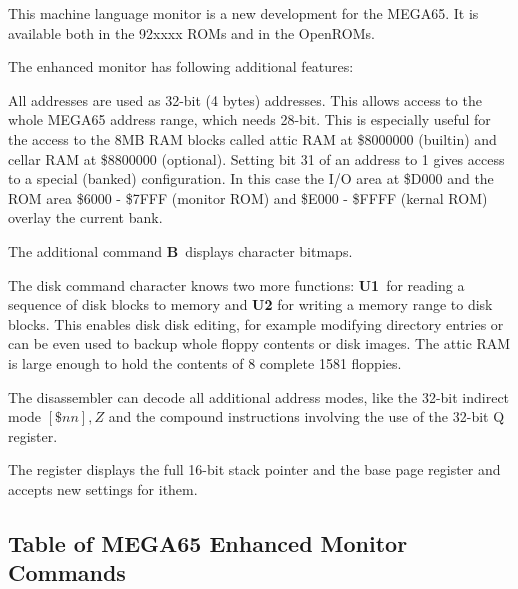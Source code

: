 This machine language monitor is a new development for the MEGA65.
It is available both in the 92xxxx ROMs and in the OpenROMs.

The enhanced monitor has following additional features:
\begin{description}[leftmargin=1cm,style=nextline]
\item[Adddresses:] All addresses are used as 32-bit (4 bytes) addresses.
   This allows access to the whole MEGA65 address range, which needs
   28-bit. This is especially useful for the access to the 8MB RAM blocks
   called attic RAM at \$8000000 (builtin) and cellar RAM at
   \$8800000 (optional). Setting bit 31 of an address to 1 gives access
   to a special (banked) configuration. In this case the I/O area at \$D000
   and the ROM area \$6000 - \$7FFF (monitor ROM) and \$E000 - \$FFFF
   (kernal ROM) overlay the current bank.

\item[Commands:] The additional command {\bf B} displays character bitmaps.

\item[Disk access:] The disk command character {\bf \@} knows two more
  functions: {\bf U1} for reading a sequence of disk blocks to memory and
  {\bf U2} for writing a memory range to disk blocks. This enables disk
  disk editing, for example modifying directory entries or can be even
  used to backup whole floppy contents or disk images. The attic RAM is
  large enough to hold the contents of 8 complete 1581 floppies.

\item[Disassembler:] The disassembler can decode all additional
  address modes, like the 32-bit indirect mode $[\$nn],Z$
  and the compound instructions involving the use of the 32-bit Q register.

\item[Register:] The register displays the full 16-bit stack pointer
 and the base page register and accepts new settings for ithem.

\end{description}

\subsection{Table of MEGA65 Enhanced Monitor Commands}

